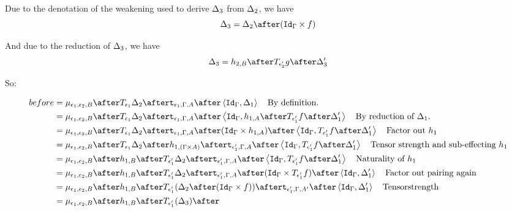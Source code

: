 \documentclass{report}
\begin{document}
                Due to the denotation of the weakening used to derive $\Delta_3$ from $\Delta_2$, we have 
                \begin{equation}
                    \D_3 = \D_2\after(\idg\times f)
                \end{equation}

                And due to the reduction of $\Delta_3$,
                we have 
                \begin{equation}
                    \D_3 = h_{2, B} \after \T{\e_2'}{g}\after \D_3'
                \end{equation}

                So:

                \begin{align}
                    before &= \bind{\e_1}{\e_2}{B}\after \T{\e_1}{\D_2}\after\tstrength{\e_1}{\G}{A}\after\pr{\idg}{\D_1}\qt{By definition.}\\
                    &= \bind{\e_1}{\e_2}{B}\after \T{\e_1}{\D_2}\after\tstrength{\e_1}{\G}{A}\after\pr{\idg}{h_{1, A}\after\T{\e_1'}{f}\after\D_1'}\qt{By reduction of $\D_1$.}\\
                    &= \bind{\e_1}{\e_2}{B}\after \T{\e_1}{\D_2}\after\tstrength{\e_1}{\G}{A}\after(\idg\times h_{1, A})\after\pr{\idg}{\T{\e_1'}{f}\after\D_1'}\qt{Factor out $h_1$}\\
                    &= \bind{\e_1}{\e_2}{B}\after \T{\e_1}{\D_2}\after
                    h_{1, (\G\times A)}\after
                    \tstrength{\e_1'}{\G}{A}\after\pr{\idg}{\T{\e_1'}{f}\after\D_1'}\qt{Tensor strength and sub-effecting $h_1$}\\
                    &= \bind{\e_1}{\e_2}{B}\after 
                    h_{1, B}\after\T{\e_1'}{\D_2}\after
                    \tstrength{\e_1'}{\G}{A}\after\pr{\idg}{\T{\e_1'}{f}\after\D_1'}\qt{Naturality of $h_1$}\\
                    &= \bind{\e_1}{\e_2}{B}\after 
                    h_{1, B}\after\T{\e_1'}{\D_2}\after
                    \tstrength{\e_1'}{\G}{A}\after(\idg\times \T{\e_1'}{f})\after\pr{\idg}{\D_1'}\qt{Factor out pairing again}\\
                    &= \bind{\e_1}{\e_2}{B}\after 
                    h_{1, B}\after\T{\e_1'}{(\D_2\after(\idg\times f))}\after
                    \tstrength{\e_1'}{\G}{A'}\after\pr{\idg}{\D_1'}\qt{Tensorstrength}\\
                    &= \bind{\e_1}{\e_2}{B}\after 
                    h_{1, B}\after\T{\e_1'}{(\D_3)}\after

\end{align}
\end{document}
